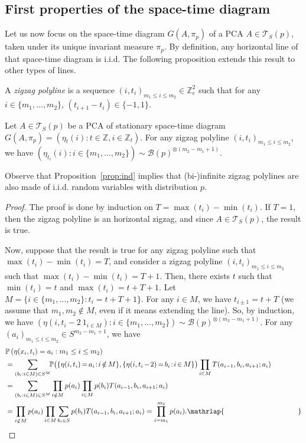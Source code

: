 \documentclass[AHL,Unicode,longabstracts]{cedram}
\newcounter{a}
\newcommand{\ind}[1]{1_{#1}}
\newcommand{\triang}[2]{\mathcal{T}_{#1} \left(#2 \right)}
\newcommand{\ZZ}{\mathbb{Z}}
\newcommand{\Z}{\mathbb{Z}}
\newcommand{\Pbb}{\mathbb{P}}
\newcommand*{\Mk}{\mkern -2mu}
\begin{document}
\subsection{First properties of the space-time diagram}

Let us now focus on the space-time diagram $G(A,\pi_p)$ of a PCA $A\in\triang{S}{p}$, taken under its unique invariant measure $\pi_p$. By definition, any horizontal line of that space-time diagram is i.i.d. The following proposition extends this result to other types of lines.

\begin{defi}\label{def:zigzagpolyline}
A \emph{zigzag polyline} is a sequence $(i,t_i)_{m_1\leq i\leq m_2}\in \Z_{e}^2$ such that for any $i\in\{m_1,\ldots, m_2\}$, $(t_{i+1}-t_i)\in\{-1,1\}$.
\end{defi}

\begin{prop}\label{prop:ind}
Let $A \in \triang{S}{p}$ be a PCA of stationary space-time diagram $G(A,\pi_p)=(\eta_t(i) : t \in \ZZ, i \in \ZZ_t)$. For any zigzag polyline $(i,t_i)_{m_1\leq i\leq m_2}$, we have $(\eta_{t_i}(i) : i \in \{m_1,\ldots,m_2\}) \sim \mathcal{B}(p)^{\otimes (m_2-m_1+1)}$.
\end{prop}

Observe that Proposition~\ref{prop:ind} implies that (bi-)infinite zigzag polylines are also made of i.i.d. random variables with distribution $p$.

\begin{proof}
The proof is done by induction on $T = \max(t_i) - \min(t_i)$. If $T = 1$, then the zigzag polyline is an horizontal zigzag, and since $A \in \triang{S}{p}$, the result is true.

Now, suppose that the result is true for any zigzag polyline such that $\max(t_i)-\min(t_i) = T$, and consider a zigzag polyline $(i,t_i)_{m_1\leq i\leq m_2}$ such that $\max(t_i) - \min(t_i) = T+1$. Then, there exists $t$ such that $\min(t_i) = t$ and $\max(t_i) =t+T+1$. Let $M = \{i \in \{m_1,\ldots,m_2\} : t_i = t+T+1\}$. For any $i \in M$, we have $t_{i\pm 1} = t+T$ (we assume that $m_1,m_2\notin M$, even if it means extending the line). So, by induction, we have $(\eta(i,t_i - 2\ \ind{i \in M}) : i \in \{m_1,\ldots,m_2\}) \sim \mathcal{B}(p)^{\otimes (m_2-m_1+1)}$. For any $(a_i)_{m_1 \leq i \leq m_2}\in S^{m_2-m_1+1}$, we have
\begin{align*}
&\Pbb\left(\eta(x_i,t_i) = a_i : m_1 \leq i \leq m_2\right)\\
& = \sum_{(b_i : i \in M) \in S^{M}} \!\!\Pbb\big(\{\eta(i,t_i) \Mk=\Mk a_i\!:\!i \Mk\notin\Mk M\},\{\eta(i,t_i\Mk-\Mk2) \Mk=\Mk b_i\!:\!i \Mk\in\Mk M\}\big) \prod_{i \in M} T(a_{i-1},b_i,a_{i+1} ; a_i) \\
& = \sum_{(b_i : i \in M) \in S^{M}} \prod_{i \notin M} p(a_i) \prod_{i \in M} p(b_i) T(a_{i-1},b_i,a_{i+1} ; a_i) \\
& = \prod_{i \notin M} p(a_i) \prod_{i \in M} \sum_{b_i \in S} p(b_i) T(a_{i-1},b_i,a_{i+1} ; a_i) = \prod_{i =m_1}^{m_2} p(a_i).\mathrlap{\mkern 185mu\qed}
\end{align*}
\let\qed\relax
\end{proof}
\end{document}
